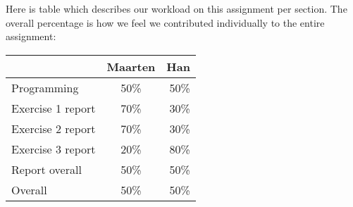 \addtocounter{exerciseCount}{1} \noindent {} \par
Here is table which describes our workload on this assignment per section. The overall percentage is how we feel we contributed individually to the entire assignment:

\begin{tabular}{ l | c | r }
    & Maarten & Han \\ \hline
  Programming & 50\% & 50\% \\
  \hline
  Exercise 1 report & 70\% & 30\% \\
  Exercise 2 report & 70\% & 30\% \\
  Exercise 3 report & 20\% & 80\% \\
  \hline
  Report overall & 50\% & 50\% \\ \hline \hline
  Overall & 50\% & 50\%
\end{tabular}